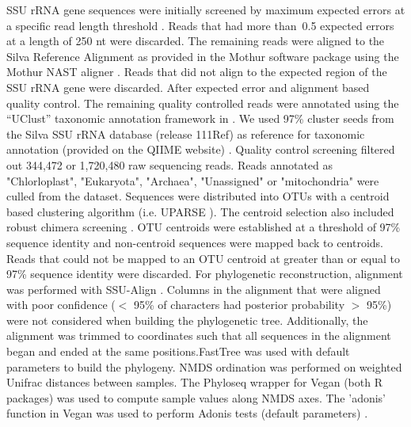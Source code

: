 SSU rRNA gene sequences were initially screened by maximum expected errors at
a specific read length threshold  \citep{edgar2013}. Reads that had more
than~0.5 expected errors at a length of 250 nt were discarded. The remaining
reads were aligned to the Silva Reference Alignment as provided in the Mothur
software package using the Mothur NAST aligner
\citep{DeSantis2005,schloss2009}. Reads that did not align to the expected
region of the SSU rRNA gene were discarded. After expected error and alignment
based quality control. The remaining quality controlled reads were
annotated using the “UClust” taxonomic annotation framework in
\citep{caporaso2010,edgar2010}. We used 97\% cluster seeds from the Silva SSU
rRNA database (release 111Ref) \citep{quast2013} as reference for taxonomic
annotation (provided on the QIIME website) \citep{quast2013}. Quality control
screening filtered out 344,472 or 1,720,480 raw sequencing reads. Reads
annotated as "Chlorloplast", "Eukaryota", "Archaea", "Unassigned" or
"mitochondria" were culled from the dataset. Sequences were distributed into
OTUs with a centroid based clustering algorithm (i.e. UPARSE
\citep{edgar2013}). The centroid selection also included robust chimera
screening \citep{edgar2013}. OTU centroids were established at a threshold of
97\% sequence identity and non-centroid sequences were mapped back to
centroids. Reads that could not be mapped to an OTU centroid at greater than or
equal to 97\% sequence identity were discarded. For phylogenetic
reconstruction, alignment was performed with SSU-Align
\citep{nawrocki2009,nawrocki2013}. Columns in the alignment that were aligned
with poor confidence ($<$ 95\% of characters had posterior probability $>$
95\%) were not considered when building the phylogenetic tree. Additionally, the
alignment was trimmed to coordinates such that all sequences in the alignment
began and ended at the same positions.FastTree
\citep{price2010} was used with default parameters to build the phylogeny. NMDS
ordination was performed on weighted Unifrac \citep{lozupone2005} distances
between samples. The Phyloseq \citep{mcmurdie2013} wrapper for Vegan
\citep{oksanen2015} (both R packages) was used to compute sample values along
NMDS axes. The 'adonis' function in Vegan was used to perform Adonis tests
(default parameters) \citep{Anderson2001a}.

